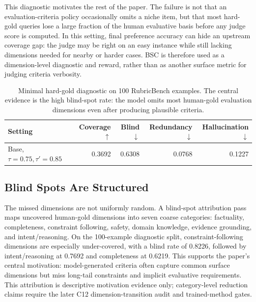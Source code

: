 This diagnostic motivates the rest of the paper. The failure is not that an
evaluation-criteria policy occasionally omits a niche item, but that most hard-gold
queries lose a large fraction of the human evaluative basis before any judge
score is computed. In this setting, final preference accuracy can hide an
upstream coverage gap: the judge may be right on an easy instance while still
lacking dimensions needed for nearby or harder cases. BSC is therefore used as
a dimension-level diagnostic and reward, rather than as another surface metric
for judging criteria verbosity.

\begin{table}[t]
\centering
\begin{tabular}{lrrrr}
\toprule
Setting & Coverage$\uparrow$ & Blind$\downarrow$ & Redundancy$\downarrow$ & Hallucination$\downarrow$ \\
\midrule
Base, $\tau=0.75,\tau'=0.85$ & 0.3692 & 0.6308 & 0.0768 & 0.1227 \\
\bottomrule
\end{tabular}
\caption{Minimal hard-gold diagnostic on 100 RubricBench examples. The
central evidence is the high blind-spot rate: the model omits most
human-gold evaluation dimensions even after producing plausible criteria.}
\label{tab:minimal_blindspot}
\end{table}

\subsection{Blind Spots Are Structured}

The missed dimensions are not uniformly random. A blind-spot attribution pass
maps uncovered human-gold dimensions into seven coarse categories: factuality,
completeness, constraint following, safety, domain knowledge, evidence
grounding, and intent/reasoning. On the 100-example diagnostic split,
constraint-following dimensions are especially under-covered, with a blind
rate of 0.8226, followed by intent/reasoning at 0.7692 and completeness at
0.6219. This supports the paper's central motivation: model-generated criteria
often capture common surface dimensions but miss long-tail constraints and
implicit evaluative requirements. This attribution is descriptive motivation
evidence only; category-level reduction claims require the later C12
dimension-transition audit and trained-method gates.

